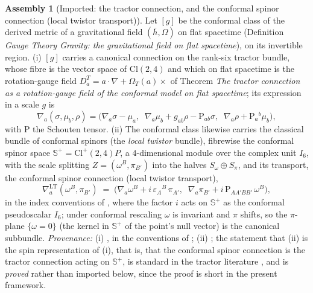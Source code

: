 \documentclass[11pt]{article}
\theoremstyle{definition}
\newtheorem{assembled}[theorem]{Assembly}
\theoremstyle{plain}
\newcommand{\changedmark}[2]{\marginpar{\raggedright\scriptsize\color{#1}#2}}
\providecommand{\CS}{}\renewcommand{\CS}{{\mathbb{S}^{+}}}
\providecommand{\Cl}{}\renewcommand{\Cl}{\mathrm{Cl}}
\providecommand{\Som}{}\renewcommand{\Som}{S_\omega}
\providecommand{\Spi}{}\renewcommand{\Spi}{S_\pi}
\providecommand{\hb}{}\renewcommand{\hb}{\bar{h}}
\begin{document}
\begin{assembled}[Imported: the tractor connection, and the conformal spinor connection (local twistor transport)]\label{c:correspondence.imported-tractor-connection-local-twistor-transport}
\changedmark{gray}{reworded}
Let $[g]$ be the conformal class of the derived metric of a gravitational field $(\hb, \Omega)$ on flat spacetime (Definition \emph{Gauge Theory Gravity: the gravitational field on flat spacetime}), on its invertible region. (i) $[g]$ carries a canonical connection on the rank-six tractor bundle, whose fibre is the vector space of $\Cl(2,4)$ and which on flat spacetime is the rotation-gauge field $D^{T}_{a} = a \cdot \nabla + \Omega_{T}(a)\times$ of Theorem \emph{The tractor connection as a rotation-gauge field of the conformal model on flat spacetime}; its expression in a scale $g$ is
\[
\nabla_a(\sigma, \mu_b, \rho) = \bigl(\nabla_a\sigma - \mu_a,\;\; \nabla_a\mu_b + g_{ab}\rho - \mathrm{P}_{ab}\sigma,\;\; \nabla_a\rho + \mathrm{P}_a{}^b\mu_b\bigr),
\]
with $\mathrm{P}$ the Schouten tensor. (ii) The conformal class likewise carries the classical bundle of conformal spinors (the \emph{local twistor} bundle), fibrewise the conformal spinor space $\CS = \Cl^+(2,4)P$, a $4$-dimensional module over the complex unit $I_6$, with the scale splitting $Z = (\omega^B, \pi_{B'})$ into the halves $\Som \oplus \Spi$, and its transport, the conformal spinor connection (local twistor transport),
\[
\nabla^{\mathrm{LT}}_a(\omega^B, \pi_{B'}) \;=\; \bigl(\nabla_a \omega^B + i\,\varepsilon_A{}^B\,\pi_{A'},\;\; \nabla_a\pi_{B'} + i\,\mathrm{P}_{AA'BB'}\,\omega^B\bigr),
\]
in the index conventions of \cite[Vol.~2, Ch.~6]{PenroseRindler86}, where the factor $i$ acts on $\CS$ as the conformal pseudoscalar $I_6$; under conformal rescaling $\omega$ is invariant and $\pi$ shifts, so the $\pi$-plane $\{\omega = 0\}$ (the kernel in $\CS$ of the point's null vector) is the canonical subbundle. \emph{Provenance:} (i) \cite{BEG1994, CurryGover2018}, in the conventions of \cite[Fact 4.1, eq.~(3)]{ButlerT6}; (ii) \cite{PenroseMacCallum73, Dighton74}; the statement that (ii) is the spin representation of (i), that is, that the conformal spinor connection is the tractor connection acting on $\CS$, is standard in the tractor literature \cite{BEG1994, CurryGover2018}, and is \emph{proved} rather than imported below, since the proof is short in the present framework.
\end{assembled}
\end{document}
